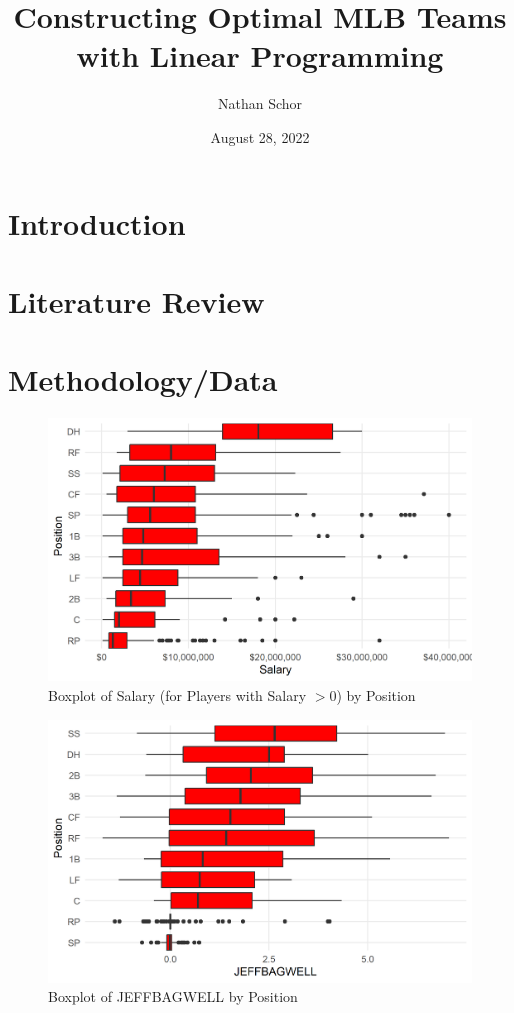 \documentclass{article}
\title{Constructing Optimal MLB Teams with Linear Programming}
\author{Nathan Schor}
\date{August 28, 2022}
\begin{document}
\maketitle
\begin{singlespace}
\tableofcontents
\end{singlespace}

\section{Introduction}

\section{Literature Review}

\section{Methodology/Data}

\begin{figure}[h]
\caption{Boxplot of Salary (for Players with Salary $> 0$) by Position}
\label{fig:salary_position_boxplot}
\centering
\includegraphics[width=0.7\paperwidth, scale=1.25]{salary_position_boxplots.png}
\end{figure}

\begin{figure}[h]
\caption{Boxplot of JEFFBAGWELL by Position}
\label{fig:salary_war_boxplot}
\centering
\includegraphics[width=0.7\paperwidth, scale=1.25]{war_position_boxplots.png}
\end{figure}
\end{document}

